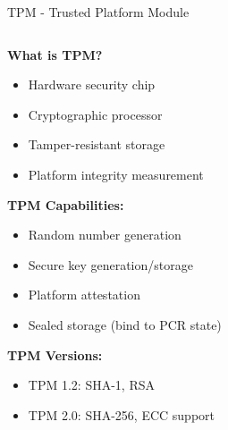 \documentclass[aspectratio=169,12pt]{beamer}
\begin{document}
\begin{frame}{TPM - Trusted Platform Module}
    \begin{columns}
        \begin{column}{0.5\textwidth}
            \textbf{What is TPM?}
            \begin{itemize}
                \item Hardware security chip
                \item Cryptographic processor
                \item Tamper-resistant storage
                \item Platform integrity measurement
            \end{itemize}
            
            \vspace{0.3cm}
            \textbf{TPM Capabilities:}
            \begin{itemize}
                \item Random number generation
                \item Secure key generation/storage
                \item Platform attestation
                \item Sealed storage (bind to PCR state)
            \end{itemize}
            
            \vspace{0.3cm}
            \textbf{TPM Versions:}
            \begin{itemize}
                \item TPM 1.2: SHA-1, RSA
                \item TPM 2.0: SHA-256, ECC support
            \end{itemize}
        \end{column}
        \begin{column}{0.5\textwidth}
\end{column}
\end{columns}
\end{frame}
\end{document}
